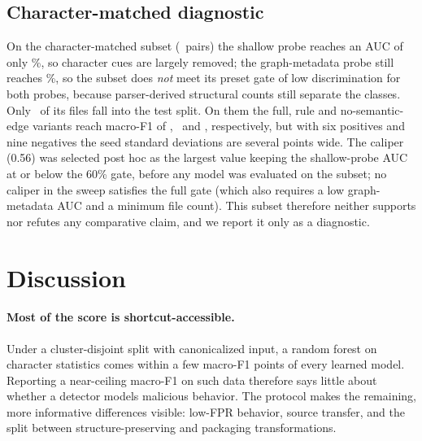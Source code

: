 \documentclass[pdflatex,sn-mathphys-num]{sn-jnl}
\begin{document}
\subsection{Character-matched diagnostic}\label{sec:r-char}
On the character-matched subset (\CharMatchedPairs\ pairs) the shallow probe
reaches an AUC of only \CharMatchedShallowAuc\%, so character cues are largely
removed; the graph-metadata probe still reaches \CharMatchedGraphmetaAuc\%, so the
subset does \emph{not} meet its preset gate of low discrimination for both
probes, because parser-derived structural counts still separate the classes.
Only \CharMatchedN\ of its files fall into the test split. On them the full,
rule and no-semantic-edge variants reach macro-F1 of \CharMatchedFullFOne,
\CharMatchedRuleFOne\ and \CharMatchedNoESemFOne, respectively, but with six
positives and nine negatives the seed standard deviations are several points
wide. The caliper (0.56) was selected post hoc as the largest value keeping the
shallow-probe AUC at or below the 60\% gate, before any model was
evaluated on the subset; no caliper in the sweep satisfies the full gate (which
also requires a low graph-metadata AUC and a minimum file count). This subset
therefore neither supports nor refutes any comparative claim, and we report it
only as a diagnostic.

\section{Discussion}\label{sec:discussion}
\paragraph{Most of the score is shortcut-accessible.} Under a cluster-disjoint
split with canonicalized input, a random forest on character statistics comes
within a few macro-F1 points of every learned model. Reporting a near-ceiling
macro-F1 on such data therefore says little about whether a detector models
malicious behavior. The protocol makes the remaining, more informative
differences visible: low-FPR behavior, source transfer, and the split between
structure-preserving and packaging transformations.
\end{document}
